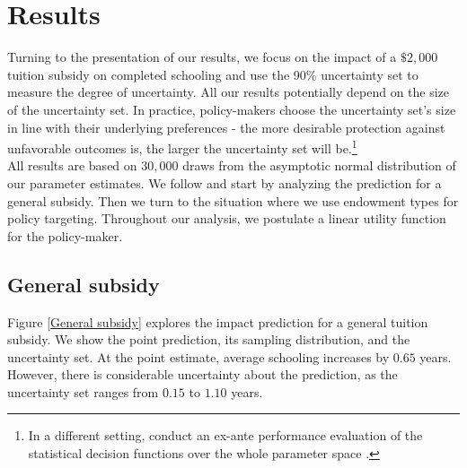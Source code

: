 \FloatBarrier\section{Results}\label{Results}
Turning to the presentation of our results, we focus on the impact of a $\$2,000$ tuition subsidy on completed schooling and use the 90\% uncertainty set to measure the degree of uncertainty.  All our results potentially depend on the size of the uncertainty set. In practice, policy-makers choose the uncertainty set's size in line with their underlying preferences - the more desirable protection against unfavorable outcomes is, the larger the uncertainty set will be.\footnote{In a different setting, \citet{Blesch.2021} conduct an ex-ante performance evaluation  of the statistical decision functions over the whole parameter space \citep{Wald.1950,Manski.2021}.}\\

\noindent All results are based on $30,000$ draws from the asymptotic normal distribution of our parameter estimates. We follow \citet{Keane.1997} and start by analyzing the prediction for a general subsidy. Then we turn to the situation where we use endowment types for policy targeting. Throughout our analysis, we postulate a linear utility function for the policy-maker.
\subsection{General subsidy}
\noindent  Figure \ref{General subsidy} explores the impact prediction for a general tuition subsidy. We show the point prediction, its sampling distribution, and the uncertainty set. At the point estimate, average schooling increases by $0.65$ years. However, there is considerable uncertainty about the prediction, as the uncertainty set ranges from $0.15$ to $1.10$ years.\\

